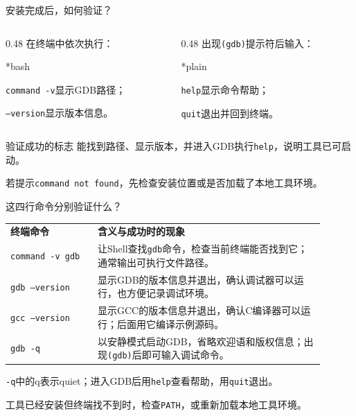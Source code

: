 \begin{frame}{安装完成后，如何验证？}
    \begin{columns}[T]
        \begin{column}{0.48\textwidth}
            在\alert{终端}中依次执行：
            \begin{Code}*{bash}
                
            \end{Code}
            \texttt{command -v}显示GDB路径；\par
            \texttt{--version}显示版本信息。
        \end{column}
        \begin{column}{0.48\textwidth}
            出现\alert{\texttt{(gdb)}}提示符后输入：
            \begin{Code}*{plain}
                
            \end{Code}
            \texttt{help}显示命令帮助；\par
            \texttt{quit}退出并回到终端。
        \end{column}
    \end{columns}
    \medskip
    \begin{vspquotered}{验证成功的标志}
        能找到路径、显示版本，并进入GDB执行\texttt{help}，说明工具已可启动。\par
        若提示\texttt{command not found}，先检查安装位置或是否加载了本地工具环境。
    \end{vspquotered}
\end{frame}

\begin{frame}{这四行命令分别验证什么？}
    \begin{center}
        \renewcommand{\arraystretch}{1.3}
        \begin{tabular}{p{0.25\linewidth}p{0.65\linewidth}}
            \textbf{终端命令} & \textbf{含义与成功时的现象} \\
            \texttt{command -v gdb} &
                让Shell查找\texttt{gdb}命令，检查当前终端能否找到它；通常输出可执行文件路径。 \\
            \texttt{gdb --version} &
                显示GDB的版本信息并退出，确认调试器可以运行，也方便记录调试环境。 \\
            \texttt{gcc --version} &
                显示GCC的版本信息并退出，确认C编译器可以运行；后面用它编译示例源码。 \\
            \texttt{gdb -q} &
                以安静模式启动GDB，省略欢迎语和版权信息；出现\texttt{(gdb)}后即可输入调试命令。
        \end{tabular}
    \end{center}
    \medskip
    \texttt{-q}中的q表示\alert{quiet}；进入GDB后用\texttt{help}查看帮助，用\texttt{quit}退出。
    \par\small 工具已经安装但终端找不到时，检查\texttt{PATH}，或重新加载本地工具环境。
\end{frame}

